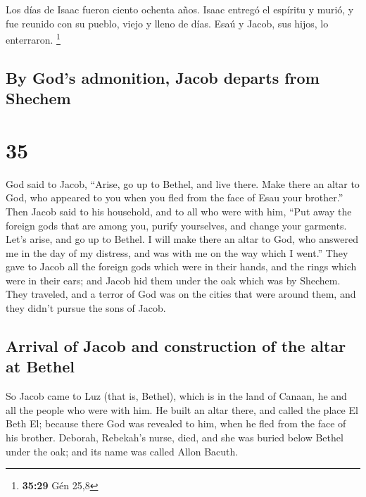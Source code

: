 \begin{paracol}{2}
 Los días de Isaac fueron ciento ochenta años.
 Isaac entregó el espíritu y murió, y fue reunido con su
pueblo, viejo y lleno de días. Esaú y Jacob, sus hijos, lo enterraron.
\footnote{\textbf{35:29} Gén 25,8}

\switchcolumn
\begin{otherlanguage}{english}

\hypertarget{by-gods-admonition-jacob-departs-from-shechem}{%
\subsection{By God's admonition, Jacob departs from
Shechem}\label{by-gods-admonition-jacob-departs-from-shechem}}

\hypertarget{section-69}{%
\section{35}\label{section-69}}

 God said to Jacob, ``Arise, go up to Bethel, and live
there. Make there an altar to God, who appeared to you when you fled
from the face of Esau your brother.''  Then Jacob said to
his household, and to all who were with him, ``Put away the foreign gods
that are among you, purify yourselves, and change your garments.
 Let's arise, and go up to Bethel. I will make there an
altar to God, who answered me in the day of my distress, and was with me
on the way which I went.''  They gave to Jacob all the
foreign gods which were in their hands, and the rings which were in
their ears; and Jacob hid them under the oak which was by Shechem.
 They traveled, and a terror of God was on the cities that
were around them, and they didn't pursue the sons of Jacob.

\hypertarget{arrival-of-jacob-and-construction-of-the-altar-at-bethel}{%
\subsection{Arrival of Jacob and construction of the altar at
Bethel}\label{arrival-of-jacob-and-construction-of-the-altar-at-bethel}}

 So Jacob came to Luz (that is, Bethel), which is in the
land of Canaan, he and all the people who were with him. 
He built an altar there, and called the place El Beth El; because there
God was revealed to him, when he fled from the face of his brother.
 Deborah, Rebekah's nurse, died, and she was buried below
Bethel under the oak; and its name was called Allon Bacuth.


\end{otherlanguage}
\end{paracol}
